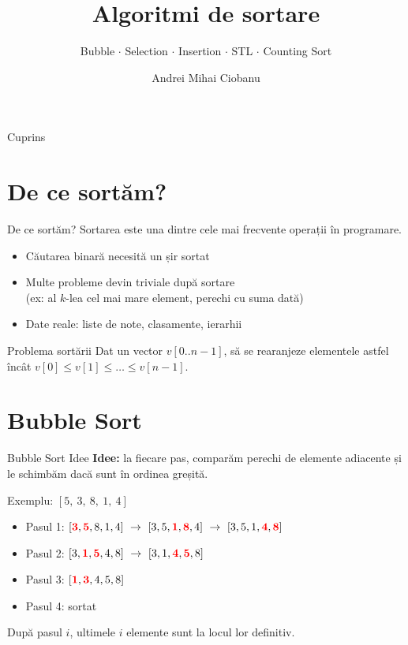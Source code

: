 ﻿\documentclass{beamer}
\title{Algoritmi de sortare}
\subtitle{Bubble $\cdot$ Selection $\cdot$ Insertion $\cdot$ STL $\cdot$ Counting Sort}
\author{Andrei Mihai Ciobanu}
\institute{Algolymp Summer School}
\date{}
\begin{document}
\begin{frame}
  \titlepage
\end{frame}

\begin{frame}{Cuprins}
  \tableofcontents
\end{frame}

\section{De ce sortăm?}

\begin{frame}{De ce sortăm?}
  Sortarea este una dintre cele mai frecvente operații în programare.
  \bigskip
  \begin{itemize}
    \item Căutarea binară necesită un șir sortat
    \item Multe probleme devin triviale după sortare \\
          (ex: al $k$-lea cel mai mare element, perechi cu suma dată)
    \item Date reale: liste de note, clasamente, ierarhii
  \end{itemize}
  \bigskip
  \begin{block}{Problema sortării}
    Dat un vector $v[0..n-1]$, să se rearanjeze elementele astfel încât
    $v[0] \leq v[1] \leq \ldots \leq v[n-1]$.
  \end{block}
\end{frame}

\section{Bubble Sort}

\begin{frame}{Bubble Sort \textemdash{} Idee}
  \textbf{Idee:} la fiecare pas, comparăm perechi de elemente adiacente și le schimbăm dacă sunt în ordinea greșită.
  \bigskip

  Exemplu: $[5,\ 3,\ 8,\ 1,\ 4]$
  \begin{itemize}
    \item Pasul 1: $[\textcolor{red}{\mathbf{3}}, \textcolor{red}{\mathbf{5}}, 8, 1, 4]\ \rightarrow\ [3, 5, \textcolor{red}{\mathbf{1}}, \textcolor{red}{\mathbf{8}}, 4]\ \rightarrow\ [3, 5, 1, \textcolor{red}{\mathbf{4}}, \textcolor{red}{\mathbf{8}}]$
    \item Pasul 2: $[3, \textcolor{red}{\mathbf{1}}, \textcolor{red}{\mathbf{5}}, 4, 8]\ \rightarrow\ [3, 1, \textcolor{red}{\mathbf{4}}, \textcolor{red}{\mathbf{5}}, 8]$
    \item Pasul 3: $[\textcolor{red}{\mathbf{1}}, \textcolor{red}{\mathbf{3}}, 4, 5, 8]$
    \item Pasul 4: sortat \checkmark
  \end{itemize}
  \medskip
  După pasul $i$, ultimele $i$ elemente sunt la locul lor definitiv.
\end{frame}
\end{document}
